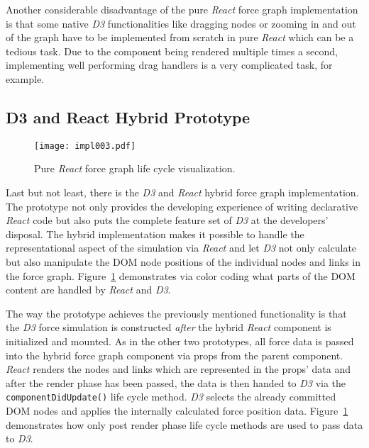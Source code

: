 Another considerable disadvantage of the pure \emph{React} force graph implementation is that some native \emph{D3} functionalities like dragging nodes or zooming in and out of the graph have to be implemented from scratch in pure \emph{React} which can be a tedious task. Due to the component being rendered multiple times a second, implementing well performing drag handlers is a very complicated task, for example.


\subsection{D3 and React Hybrid Prototype}
\label{sub:D3AndReactHybrid}

\begin{figure}
\centering
\texttt{[image: impl003.pdf]}
\caption{Pure \emph{React} force graph life cycle visualization.}
\label{fig:reactD3HybridLifeCycle}
\end{figure}

Last but not least, there is the \emph{D3} and \emph{React} hybrid force graph implementation. The prototype not only provides the developing experience of writing declarative \emph{React} code but also puts the complete feature set of \emph{D3} at the developers' disposal. The hybrid implementation makes it possible to handle the representational aspect of the simulation via \emph{React} and let \emph{D3} not only calculate but also manipulate the DOM node positions of the individual nodes and links in the force graph. Figure~\ref{fig:reactD3HybridLifeCycle} demonstrates via color coding what parts of the DOM content are handled by \emph{React} and \emph{D3}. 

The way the prototype achieves the previously mentioned functionality is that the \emph{D3} force simulation is constructed \emph{after} the hybrid \emph{React} component is initialized and mounted. As in the other two prototypes, all force data is passed into the hybrid force graph component via props from the parent component. \emph{React} renders the nodes and links which are represented in the props' data and after the render phase has been passed, the data is then handed to \emph{D3} via the \texttt{componentDidUpdate()} life cycle method. \emph{D3} selects the already committed DOM nodes and applies the internally calculated force position data. Figure~\ref{fig:reactD3HybridLifeCycle} demonstrates how only post render phase life cycle methods are used to pass data to \emph{D3}.

